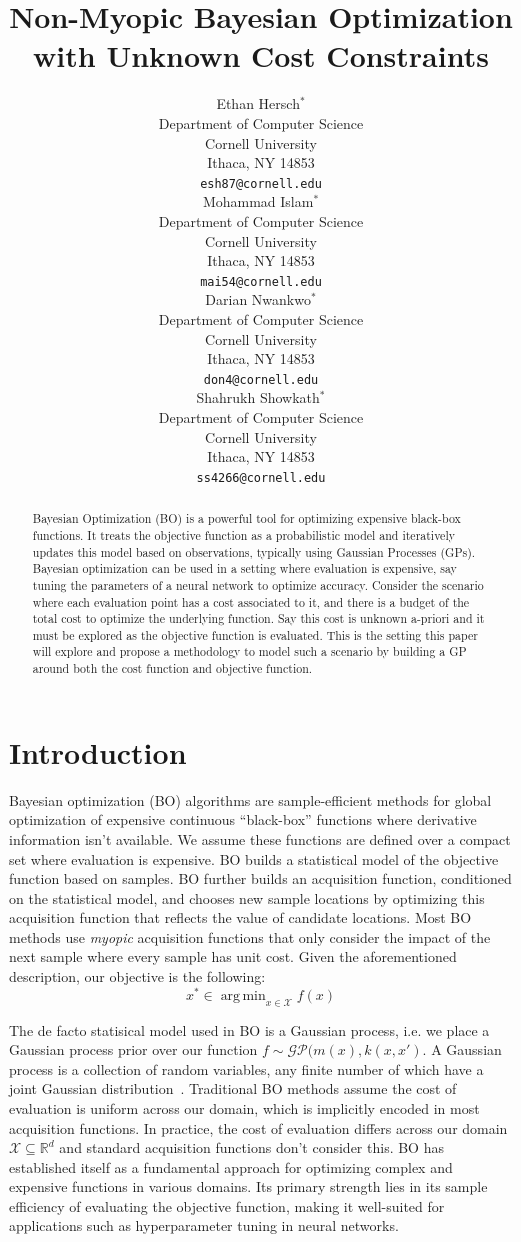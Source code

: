 \documentclass{article}
\title{Non-Myopic Bayesian Optimization with Unknown Cost Constraints}
\author{%
  Ethan Hersch$^*$ \\
  Department of Computer Science\\
  Cornell University\\
  Ithaca, NY 14853 \\
  \texttt{esh87@cornell.edu} \\
  \And
  Mohammad Islam$^*$ \\
  Department of Computer Science\\
  Cornell University\\
  Ithaca, NY 14853 \\
  \texttt{mai54@cornell.edu} \\
  \And
  Darian Nwankwo$^*$ \\
  Department of Computer Science\\
  Cornell University\\
  Ithaca, NY 14853 \\
  \texttt{don4@cornell.edu} \\
  \And
  Shahrukh Showkath$^*$ \\
  Department of Computer Science\\
  Cornell University\\
  Ithaca, NY 14853 \\
  \texttt{ss4266@cornell.edu} \\
}
\DeclareMathOperator*{\argmin}{arg\,min}
\begin{document}
\maketitle
\def\thefootnote{*}\def\thefootnote{\arabic{footnote}}


\begin{abstract}
  Bayesian Optimization (BO) is a powerful tool for optimizing 
  expensive black-box functions. It treats the objective function 
  as a probabilistic model and iteratively updates this model 
  based on observations, typically using Gaussian Processes (GPs). 
  Bayesian optimization can be used in a setting where evaluation 
  is expensive, say tuning the parameters of a neural network to 
  optimize accuracy. Consider the scenario where each evaluation 
  point has a cost associated to it, and there is a budget of the 
  total cost to optimize the underlying function. Say this cost is 
  unknown a-priori and it must be explored as the objective 
  function is evaluated. This is the setting this paper will 
  explore and propose a methodology to model such a scenario by 
  building a GP around both the cost function and objective 
  function.
\end{abstract}


\section{Introduction}
Bayesian optimization (BO) algorithms are sample-efficient methods for global optimization of
expensive continuous ``black-box'' functions where derivative 
information isn't available. We assume these functions are 
defined over a compact set where evaluation is expensive. BO 
builds a statistical model of the objective function based on 
samples. BO further builds an acquisition function, conditioned on the statistical model, and chooses new sample locations by
optimizing this acquisition function that reflects the value of 
candidate locations.
Most BO methods use {\em myopic} acquisition functions that only 
consider the impact of the next sample where every sample has unit cost. Given the aforementioned description, our objective is the following:
\[
    x^* \in \argmin_{x \in \mathcal{X}} f(x)
\]

The de facto statisical model used in BO is a Gaussian process, 
i.e. we place a Gaussian process prior over our function
$f \sim \mathcal{GP}(m(x), k(x, x')$. A Gaussian process is a 
collection of random variables, any finite number of which
have a joint Gaussian distribution~\cite{Rasmussen2006Gaussian}.
Traditional BO methods assume the cost of evaluation is uniform
across our domain, which is implicitly encoded in most acquisition
functions. 
In practice, the cost of evaluation differs across 
our domain $\mathcal{X} \subseteq \mathbb{R}^d$ and standard
acquisition functions don't consider this. BO has established 
itself as a 
fundamental approach for optimizing complex and expensive 
functions in various domains. Its primary strength lies in its 
sample efficiency of evaluating the objective function, 
making it well-suited for applications such as hyperparameter 
tuning in neural networks.
\end{document}
